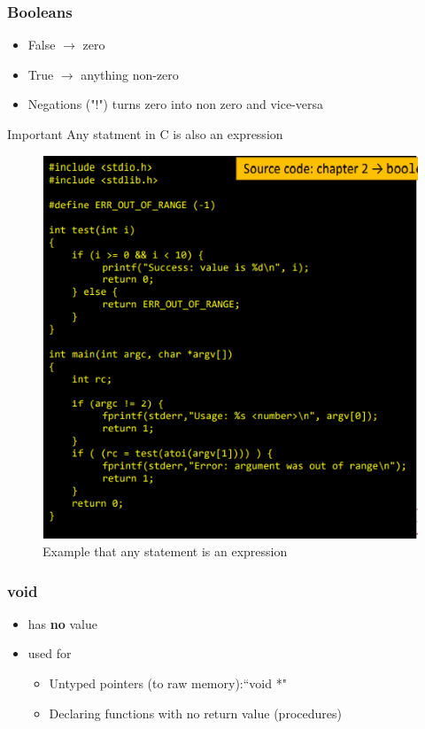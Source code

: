 \documentclass[a4paper,10pt]{article}
\begin{document}
\subsubsection{Booleans}
\begin{itemize}
    \item False $\rightarrow$ zero
    \item True $\rightarrow$ anything non-zero
    \item Negations ("!") turns zero into non zero and vice-versa
\end{itemize}
\pagebreak
\begin{tipbox}
    {Important}
    Any statment in C is also an expression
\end{tipbox}
\begin{figure}[h]
    \centering
    \includegraphics[width=0.7\linewidth]{Pictures/e12.png}
    \caption{Example that any statement is an expression}
    \label{fig:enter-label}
\end{figure}
\subsubsection{void}
\begin{itemize}
    \item has \textbf{no} value
    \item used for
    \begin{itemize}
        \item Untyped pointers (to raw memory):“void *"
        \item Declaring functions with no return value (procedures)
    \end{itemize}
\end{itemize}
\pagebreak
\end{document}

